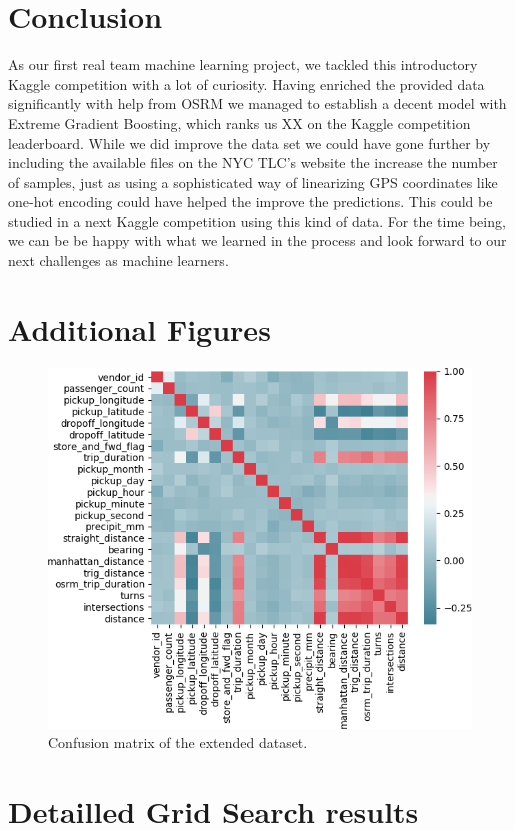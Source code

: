 \documentclass[a4paper]{article}
\begin{document}
\section{Conclusion}
As our first real team machine learning project, we tackled this introductory
Kaggle competition with a lot of curiosity. Having enriched the provided data
significantly with help from OSRM we managed to establish a decent model with
Extreme Gradient Boosting, which ranks us XX on the Kaggle competition
leaderboard. While we did improve the data set we could have gone further by
including the available files on the NYC TLC’s website the increase the number
of samples, just as using a sophisticated way of linearizing GPS coordinates
like one-hot encoding could have helped the improve the predictions. This could
be studied in a next Kaggle competition using this kind of data. For the time
being, we can be be happy with what we learned in the process and look forward
to our next challenges as machine learners.

\newpage
\footnotesize



\appendix
\newpage
\section{Additional Figures}
\begin{figure}[h!]
    \centering
    \includegraphics[width=0.8\linewidth]{confusion}
    \caption{Confusion matrix of the extended dataset.}
    \label{confusion}
\end{figure}

\section{Detailled Grid Search results}
\label{results_appendix}
\end{document}

